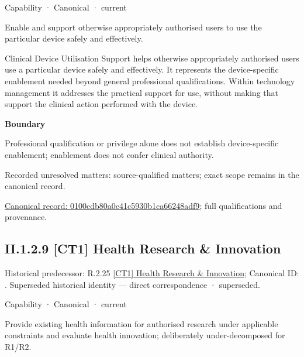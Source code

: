 \label{element:0100cdb80a0c41c5930b1ca66248adf9}
{\small Capability · Canonical · current}\par

Enable and support otherwise appropriately authorised users to use the particular device safely and effectively.



Clinical Device Utilisation Support helps otherwise appropriately authorised users use a particular device safely and effectively. It represents the device-specific enablement needed beyond general professional qualifications. Within technology management it addresses the practical support for use, without making that support the clinical action performed with the device.



\textbf{Boundary}



Professional qualification or privilege alone does not establish device-specific enablement; enablement does not confer clinical authority.


{\small Recorded unresolved matters: source-qualified matters; exact scope remains in the canonical record.}\par
{\footnotesize \href{../../../../../../../continuum/strategy/capability/0100cdb80a0c41c5930b1ca66248adf9.md}{Canonical record: 0100cdb80a0c41c5930b1ca66248adf9}; full qualifications and provenance.}\par
\subsection*{II.1.2.9 [CT1] Health Research \& Innovation}
\label{navigation:II.1.2.9}

{\small Historical predecessor: R.2.25 \hyperref[element:2cc31384c8864c73989025cbe96dcfa7]{[CT1] Health Research \& Innovation}; Canonical ID: \texttt{}. Superseded historical identity — direct correspondence · superseded.}\par
\label{element:582bf62145fd42118e5d57bb714841e8}
{\small Capability · Canonical · current}\par

Provide existing health information for authorised research under applicable constraints and evaluate health innovation; deliberately under-decomposed for R1/R2.



